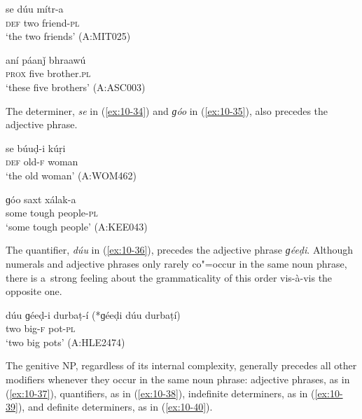 \begin{exe}
\ex
\label{ex:10-32}
\gll se dúu mítr-a \\
\textsc{def} two friend-\textsc{pl} \\
\glt `the two friends' (A:MIT025)

\ex
\label{ex:10-33}
\gll aní páanǰ bhraawú \\
\textsc{prox} five brother.\textsc{pl}  \\
\glt `these five brothers' (A:ASC003)
\end{exe}

The determiner, \textit{se} in (\ref{ex:10-34}) and \textit{ɡóo} in (\ref{ex:10-35}), also precedes the adjective phrase.

\begin{exe}
\ex
\label{ex:10-34}
\gll se búuḍ-i kúṛi \\
\textsc{def} old-\textsc{f} woman \\
\glt `the old woman' (A:WOM462)

\ex
\label{ex:10-35}
\gll ɡóo saxt xálak-a \\
some tough people-\textsc{pl}  \\
\glt `some tough people' (A:KEE043)
\end{exe}


The quantifier, \textit{dúu} in (\ref{ex:10-36}), precedes the adjective phrase \textit{ɡéeḍi}. Although numerals and adjective phrases only rarely co"=occur in the same noun phrase, there is a~strong feeling about the grammaticality of this order vis-à-vis the opposite one.

\begin{exe}
\ex
\label{ex:10-36}
\gll dúu ɡéeḍ-i durbaṭ-í (*ɡéeḍi dúu durbaṭí) \\
two big-\textsc{f} pot-\textsc{pl} \\
\glt `two big pots' (A:HLE2474)
\end{exe}


The genitive NP, regardless of its internal complexity, generally precedes all other modifiers
whenever they occur in the same noun phrase: adjective phrases, as in (\ref{ex:10-37}), quantifiers, as in (\ref{ex:10-38}), indefinite determiners, as in (\ref{ex:10-39}), and definite determiners, as in
(\ref{ex:10-40}).


